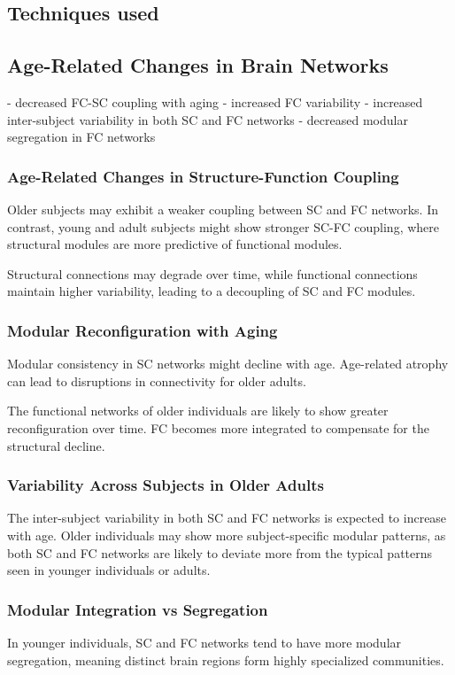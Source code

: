 \subsection{Techniques used}


\subsection{Age-Related Changes in Brain Networks}

- decreased FC-SC coupling with aging 
- increased FC variability
- increased inter-subject variability in both SC and FC networks
- decreased modular segregation in FC networks

\subsubsection {Age-Related Changes in Structure-Function Coupling}
Older subjects may exhibit a weaker coupling between SC and FC networks. 
In contrast, young and adult subjects might show stronger SC-FC coupling, 
where structural modules are more predictive of functional modules.

Structural connections may degrade over time, while functional connections maintain 
higher variability, leading to a decoupling of SC and FC modules.

\subsubsection {Modular Reconfiguration with Aging}

Modular consistency in SC networks might decline with age.
Age-related atrophy can lead to disruptions in connectivity for older adults.

The functional networks of older individuals are likely to show greater 
reconfiguration over time. FC becomes more integrated to compensate for the structural decline.


\subsubsection {Variability Across Subjects in Older Adults}
The inter-subject variability in both SC and FC networks is expected to increase with age. 
Older individuals may show more subject-specific modular patterns, as both SC and FC networks 
are likely to deviate more from the typical patterns seen in younger individuals or adults.

\subsubsection{Modular Integration vs Segregation}
In younger individuals, SC and FC networks tend to have more modular segregation, 
meaning distinct brain regions form highly specialized communities. 

